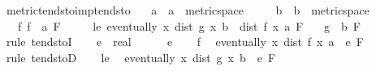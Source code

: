 \begin{isabellebody}
\endisatagproof
{\isafoldproof}%
%
\isadelimproof
\isanewline
%
\endisadelimproof
\isanewline
{}\isamarkupfalse%
\ metric{\isacharunderscore}{\kern0pt}tendsto{\isacharunderscore}{\kern0pt}imp{\isacharunderscore}{\kern0pt}tendsto{\isacharcolon}{\kern0pt}\isanewline
\ \ \ a\ {\isacharcolon}{\kern0pt}{\isacharcolon}{\kern0pt}\ {\isachardoublequoteopen}{\isacharprime}{\kern0pt}a\ {\isacharcolon}{\kern0pt}{\isacharcolon}{\kern0pt}\ metric{\isacharunderscore}{\kern0pt}space{\isachardoublequoteclose}\isanewline
\ \ \ \ \ b\ {\isacharcolon}{\kern0pt}{\isacharcolon}{\kern0pt}\ {\isachardoublequoteopen}{\isacharprime}{\kern0pt}b\ {\isacharcolon}{\kern0pt}{\isacharcolon}{\kern0pt}\ metric{\isacharunderscore}{\kern0pt}space{\isachardoublequoteclose}\isanewline
\ \ \ f{\isacharcolon}{\kern0pt}\ {\isachardoublequoteopen}{\isacharparenleft}{\kern0pt}f\ {\isasymlonglongrightarrow}\ a{\isacharparenright}{\kern0pt}\ F{\isachardoublequoteclose}\isanewline
\ \ \ \ \ le{\isacharcolon}{\kern0pt}\ {\isachardoublequoteopen}eventually\ {\isacharparenleft}{\kern0pt}{\isasymlambda}x{\isachardot}{\kern0pt}\ dist\ {\isacharparenleft}{\kern0pt}g\ x{\isacharparenright}{\kern0pt}\ b\ {\isasymle}\ dist\ {\isacharparenleft}{\kern0pt}f\ x{\isacharparenright}{\kern0pt}\ a{\isacharparenright}{\kern0pt}\ F{\isachardoublequoteclose}\isanewline
\ \ \ {\isachardoublequoteopen}{\isacharparenleft}{\kern0pt}g\ {\isasymlonglongrightarrow}\ b{\isacharparenright}{\kern0pt}\ F{\isachardoublequoteclose}\isanewline
%
\isadelimproof
%
\endisadelimproof
%
\isatagproof
{}\isamarkupfalse%
\ {\isacharparenleft}{\kern0pt}rule\ tendstoI{\isacharparenright}{\kern0pt}\isanewline
\ \ \isamarkupfalse%
\ e\ {\isacharcolon}{\kern0pt}{\isacharcolon}{\kern0pt}\ real\isanewline
\ \ \isamarkupfalse%
\ {\isachardoublequoteopen}{}\ {\isacharless}{\kern0pt}\ e{\isachardoublequoteclose}\isanewline
\ \ \isamarkupfalse%
\ f\ \isamarkupfalse%
\ {\isachardoublequoteopen}eventually\ {\isacharparenleft}{\kern0pt}{\isasymlambda}x{\isachardot}{\kern0pt}\ dist\ {\isacharparenleft}{\kern0pt}f\ x{\isacharparenright}{\kern0pt}\ a\ {\isacharless}{\kern0pt}\ e{\isacharparenright}{\kern0pt}\ F{\isachardoublequoteclose}\ \isamarkupfalse%
\ {\isacharparenleft}{\kern0pt}rule\ tendstoD{\isacharparenright}{\kern0pt}\isanewline
\ \ \isamarkupfalse%
\ le\ \isamarkupfalse%
\ {\isachardoublequoteopen}eventually\ {\isacharparenleft}{\kern0pt}{\isasymlambda}x{\isachardot}{\kern0pt}\ dist\ {\isacharparenleft}{\kern0pt}g\ x{\isacharparenright}{\kern0pt}\ b\ {\isacharless}{\kern0pt}\ e{\isacharparenright}{\kern0pt}\ F{\isachardoublequoteclose}\isanewline

\end{isabellebody}
